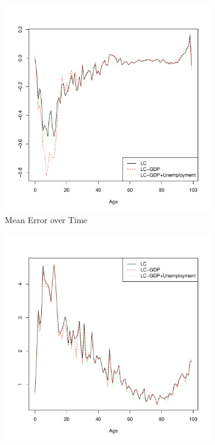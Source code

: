 \documentclass[AER, draftmode]{AEA}
\begin{document}
\begin{figure}[!htp]
	\begin{subfigure}{0.4\textwidth}
		\includegraphics[width=\linewidth]{CAN_error_age_female} 
		\caption{Mean Error over Time}
	\end{subfigure}
	\begin{subfigure}{0.4\textwidth}
		\includegraphics[width=\linewidth]{CAN_abs_error_age_female} 

\end{subfigure}
\end{figure}
\end{document}
